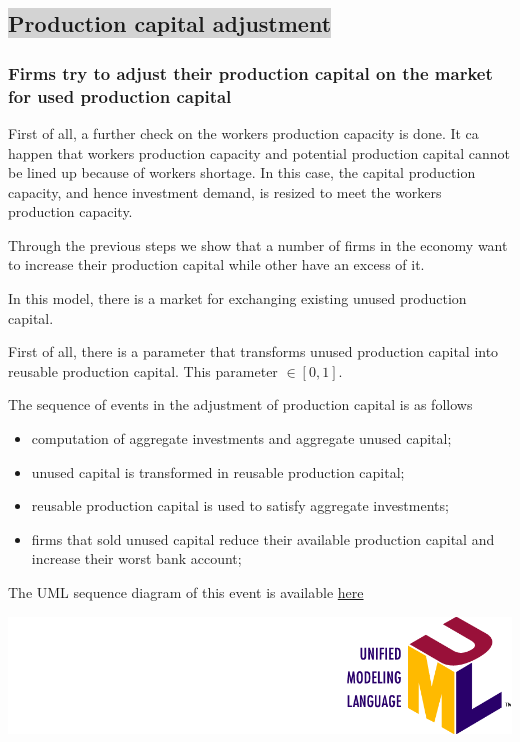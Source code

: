 \documentclass{book}
\newcommand{\umllocation}{file:///Users/giulioni/Dropbox/svn/sfcabm_my/documentation}
\begin{document}
\subsection*{\colorbox{lightgray}{Production capital adjustment}}


\subsubsection{Firms try to adjust their production capital on the market for used production capital}

First of all, a further check on the workers production capacity is done.
It ca happen that workers production capacity and potential production capital cannot be lined up because of workers shortage. In this case, the capital production capacity, and hence investment demand, is resized to meet the workers production capacity.

Through the previous steps we show that a number of firms in the economy want to increase their production capital while other have an excess of it.

In this model, there is a market for exchanging existing unused production capital.

First of all, there is a parameter that transforms unused production capital into reusable production capital.
This parameter $\in[0,1]$.

The sequence of events in the adjustment of production capital is as follows
\begin{itemize}
	\item computation of aggregate investments and aggregate unused capital;
	\item unused capital is transformed in reusable production capital;
	\item reusable production capital is used to satisfy aggregate investments;
	\item firms that sold unused capital reduce their available production capital and increase their worst bank account;
\end{itemize}

\vskip3mm
The UML sequence diagram of this event is available \href{\umllocation/adjustProductionCapitalAndBankAccount.html}{here}
\begin{marginfigure}
	\includegraphics[scale=0.1]{uml.png}
\end{marginfigure}
\end{document}
